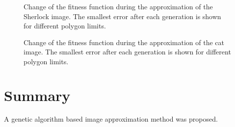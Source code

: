 \documentclass[conference]{IEEEtran}
\begin{document}
\begin{figure}[htbp]
	\centering
		\resizebox{.45\textwidth}{!}{}
	\caption{Change of the fitness function during the approximation of the Sherlock image.
	The smallest error after each generation is shown for different polygon limits.} %
	\label{curve-sherlock}
\end{figure}

\begin{figure}[htbp]
	\centering
		\resizebox{.45\textwidth}{!}{}
	\caption{Change of the fitness function during the approximation of the cat image.
	The smallest error after each generation is shown for different polygon limits.}
	\label{curve-cat}
\end{figure}


\section{Summary}

A genetic algorithm based image approximation method
was proposed.
\end{document}
